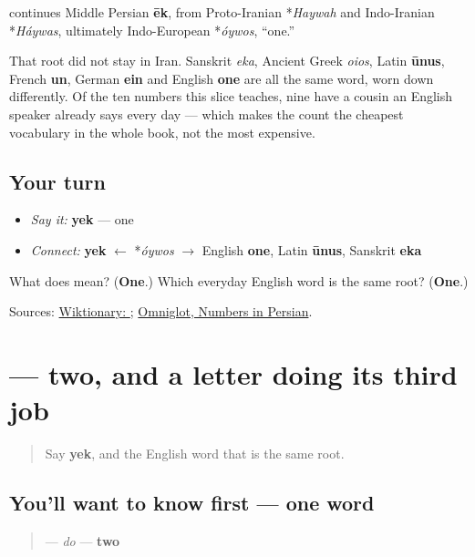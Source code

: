 \begin{cousinweb}
\textbf{} continues Middle Persian \textbf{ēk}, from Proto-Iranian *\emph{Haywah} and Indo-Iranian *\emph{Háywas}, ultimately Indo-European *\emph{óywos}, \textquotedblleft{}one.\textquotedblright{}

That root did not stay in Iran. Sanskrit \emph{eka}, Ancient Greek \emph{oios}, Latin \textbf{ūnus}, French \textbf{un}, German \textbf{ein} and English \textbf{one} are all the same word, worn down differently. Of the ten numbers this slice teaches, nine have a cousin an English speaker already says every day — which makes the count the cheapest vocabulary in the whole book, not the most expensive.
\end{cousinweb}

\subsection*{Your turn}
\begin{itemize}
\raggedright
  \item \emph{Say it:} \textbf{yek} — one
  \item \emph{Connect:} \textbf{yek} $\leftarrow$ *\emph{óywos} $\to$ English \textbf{one}, Latin \textbf{ūnus}, Sanskrit \textbf{eka}
\end{itemize}

\begin{tcolorbox}[breakable,colback=teal!4,colframe=teal!35!black,title={Before you move on}]
What does \textbf{} mean? (\textbf{One}.) Which everyday English word is the same root? (\textbf{One}.)

Sources: \href{https://en.wiktionary.org/wiki/\%DB\%8C\%DA\%A9}{Wiktionary: }; \href{https://www.omniglot.com/language/numbers/persian.htm}{Omniglot, Numbers in Persian}.
\end{tcolorbox}
\section[\texorpdfstring{\fa{دو} (do)}{دو (do)}]{ — two, and a letter doing its third job}

\label{lesson:FA-C16-do}



\begin{quote}
Say \textbf{yek}, and the English word that is the same root.
\end{quote}

\subsection*{You'll want to know first — one word}
\begin{quote}
\textbf{} — \emph{do} — \textbf{two}
\end{quote}

